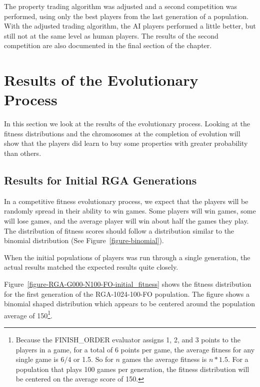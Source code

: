 The property trading algorithm was adjusted and a second competition was
performed, using only the best players from the last generation of a population.
With the adjusted trading algorithm, the AI players performed a little better,
but still not at the same level as human players. The results of the second
competition are also documented in the final section of the chapter.

\section{Results of the Evolutionary Process}

In this section we look at the results of the evolutionary process. Looking at
the fitness distributions and the chromosomes at the completion of evolution
will show that the players did learn to buy some properties with greater
probability than others.

\subsection{Results for Initial RGA Generations}

In a competitive fitness evolutionary process, we expect that the players will
be randomly spread in their ability to win games. Some players will win games,
some will lose games, and the average player will win about half the games they
play. The distribution of fitness scores should follow a distribution similar to
the binomial distribution (See Figure~\ref{figure-binomial}).

When the initial populations of players was run through a single generation, the
actual results matched the expected results quite closely.

Figure~\ref{figure-RGA-G000-N100-FO-initial_fitness} shows the fitness
distribution for the first generation of the RGA-1024-100-FO population. The
figure shows a binomial shaped distribution which appears to be centered around
the population average of 150\footnote{Because the FINISH\_ORDER evaluator
assigns 1, 2, and 3 points to the players in a game, for a total of 6 points per
game, the average fitness for any single game is \(6/4\) or 1.5. So for \(n\)
games the average fitness is \(n * 1.5\). For a population that plays 100 games
per generation, the fitness distribution will be centered on the average score
of 150.}.


